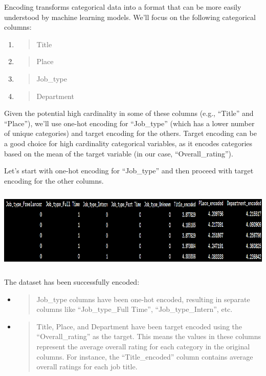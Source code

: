 \documentclass[
]{article}
\begin{document}
Encoding transforms categorical data into a format that can be more
easily understood by machine learning models. We'll focus on the
following categorical columns:

\begin{enumerate}
\def\labelenumi{\arabic{enumi}.}
\item
  \begin{quote}
  Title
  \end{quote}
\item
  \begin{quote}
  Place
  \end{quote}
\item
  \begin{quote}
  Job\_type
  \end{quote}
\item
  \begin{quote}
  Department
  \end{quote}
\end{enumerate}

Given the potential high cardinality in some of these columns (e.g.,
``Title'' and ``Place''), we'll use one-hot encoding for ``Job\_type''
(which has a lower number of unique categories) and target encoding for
the others. Target encoding can be a good choice for high cardinality
categorical variables, as it encodes categories based on the mean of the
target variable (in our case, ``Overall\_rating'').

Let's start with one-hot encoding for ``Job\_type'' and then proceed
with target encoding for the other columns.

\includegraphics[width=5.26806in,height=1.51181in]{image10.png}

The dataset has been successfully encoded:

\begin{itemize}
\item
  \begin{quote}
  Job\_type columns have been one-hot encoded, resulting in separate
  columns like ``Job\_type\_Full Time'', ``Job\_type\_Intern'', etc.
  \end{quote}
\item
  \begin{quote}
  Title, Place, and Department have been target encoded using the
  ``Overall\_rating'' as the target. This means the values in these
  columns represent the average overall rating for each category in the
  original columns. For instance, the ``Title\_encoded'' column contains
  average overall ratings for each job title.
  \end{quote}
\end{itemize}
\end{document}
